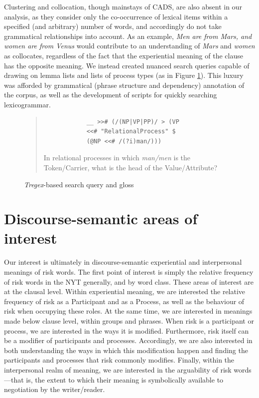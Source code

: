 		Clustering and collocation, though mainstays of CADS, are also absent in our analysis, as they consider only the co-occurrence of lexical items within a specified (and arbitrary) number of words, and accordingly do not take grammatical relationships into account. As an example, \emph{Men are from Mars, and women are from Venus} would contribute to an understanding of \emph{Mars} and \emph{women} as collocates, regardless of the fact that the experiential meaning of the clause has the opposite meaning. We instead created nuanced search queries capable of drawing on lemma lists and lists of process types (as in Figure \ref{fig:glossed}). This luxury was afforded by grammatical (phrase structure and dependency) annotation of the corpus, as well as the development of scripts for quickly searching lexicogrammar.



			\begin{figure}
			\begin{quote}
			\begin{multicols}{2}
			\begin{verbatim}
			__ >># (/(NP|VP|PP)/ > (VP
			<<# "RelationalProcess" $ 
			(@NP <<# /(?i)man/)))
			\end{verbatim}
			\noindent In relational processes in which \emph{man/men} is the Token/Carrier, what is the head of the Value/Attribute?
			\end{multicols}
			\end{quote}
			\caption{\emph{Tregex}-based search query and gloss}
			\label{fig:glossed}
			\end{figure}

			\section{Discourse-semantic areas of interest}

				Our interest is ultimately in discourse-semantic experiential and interpersonal meanings of risk words. The first point of interest is simply the relative frequency of risk words in the NYT generally, and by word class. These areas of interest are at the clausal level. Within experiential meaning, we are interested the relative frequency of risk as a Participant and as a Process, as well as the behaviour of risk when occupying these roles. At the same time, we are interested in meanings made below clause level, within groups and phrases. When risk is a participant or process, we are interested in the ways it is modified. Furthermore, risk itself can be a modifier of participants and processes. Accordingly, we are also interested in both understanding the ways in which this modification happen and finding the participants and processes that risk commonly modifies. Finally, within the interpersonal realm of meaning, we are interested in the arguability of risk words---that is, the extent to which their meaning is symbolically available to negotiation by the writer/reader.

